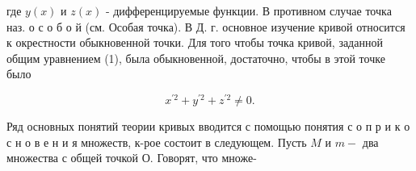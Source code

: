 \documentclass[10pt]{article}
\begin{document}
где $y(x)$ и $z(x)$ - дифференцируемые функции. В противном случае точка наз. о с о б о й (см. Особая точка). В Д. г. основное изучение кривой относится к окрестности обыкновенной точки. Для того чтобы точка кривой, заданной общим уравнением (1), была обыкновенной, достаточно, чтобы в этой точке было



\[

x^{\prime 2}+y^{\prime 2}+z^{\prime 2} \neq 0 .

\]



Ряд основных понятий теории кривых вводится с помощью понятия с о п р и к о с н о в е н и я множеств, к-рое состоит в следующем. Пусть $M$ и $m-$ два множества с общей точкой $О$. Говорят, что множе-
\end{document}

